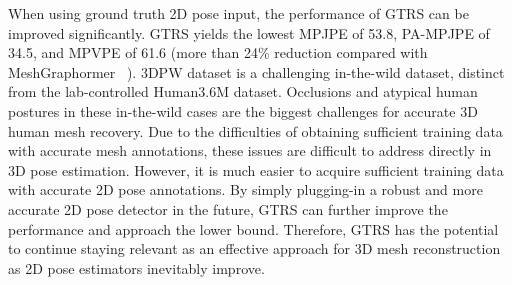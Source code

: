 \documentclass[sigconf]{acmart}
\begin{document}
When using ground truth 2D pose input, the performance of GTRS can be improved significantly. GTRS yields the lowest MPJPE of 53.8, PA-MPJPE of 34.5, and MPVPE of 61.6 (more than 24\% reduction compared with MeshGraphormer ~\cite{lin2021_mesh_graphormer}). 3DPW dataset is a challenging in-the-wild dataset, distinct from the lab-controlled Human3.6M dataset. Occlusions and atypical human postures in these in-the-wild cases are the biggest challenges for accurate 3D human mesh recovery. Due to the difficulties of obtaining sufficient training data with accurate mesh annotations, these issues are difficult to address directly in 3D pose estimation.
However, it is much easier to acquire sufficient training data with accurate 2D pose annotations. 
By simply plugging-in a robust and more accurate 2D pose detector in the future, GTRS can further improve the performance and approach the lower bound.  Therefore, GTRS has the potential to continue staying relevant as an effective approach for 3D mesh reconstruction as 2D pose estimators inevitably improve.
\end{document}
